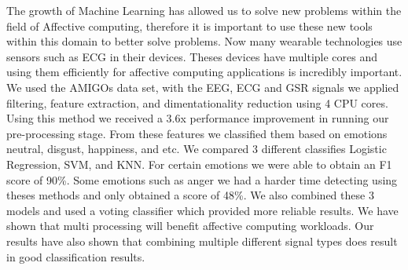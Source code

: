 The growth of Machine Learning has allowed us to solve new
problems within the field of Affective computing,
therefore it is important to use these new tools within this
domain to better solve problems.
Now many wearable technologies use sensors such as ECG in their devices.
Theses devices have multiple cores and using them efficiently for
affective computing applications is incredibly important.
We used the AMIGOs data set, with the EEG, ECG and GSR signals
we applied filtering, feature extraction, and dimentationality reduction
using 4 CPU cores.
Using this method we received a 3.6x performance improvement in running our
pre-processing stage.
From these features we classified them based on emotions
neutral, disgust, happiness, and etc.
We compared 3 different classifies Logistic Regression,
SVM, and KNN.
For certain emotions we were able to obtain an F1 score of 90\%.
Some emotions such as anger we had a harder time detecting
using theses methods and only obtained a score of 48\%.
We also combined these 3 models and used a voting classifier which provided
more reliable results.
We have shown that multi processing will benefit affective computing workloads.
Our results have also shown that combining multiple different signal types does
result in good classification results.

